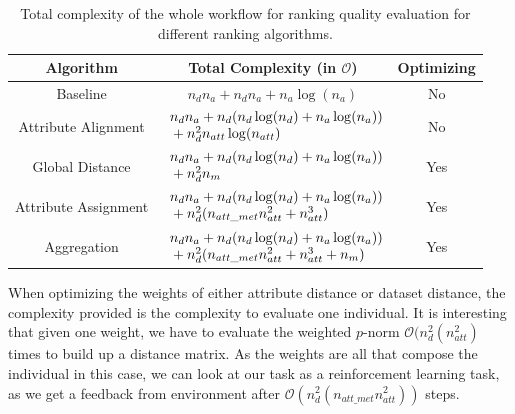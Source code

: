  \begin{table} 
 	\caption{Total complexity of the whole workflow for ranking quality evaluation for different ranking algorithms.}
 	\label{table:totalComplexities}
 	\centering 
 	\renewcommand{\arraystretch}{1.3}
 	\begin{tabular}{|c| c| c|}
 		\hline %
 		Algorithm & Total Complexity (in $\mathcal{O}$) & Optimizing \\
 		\hline 
 		Baseline & $n_dn_a + n_dn_a + n_a\log(n_a)$ & No\\ 
 		\hline 
 		Attribute Alignment& $\begin{array} {r@{}l@{}} & {} n_dn_a + n_d(n_d\log(n_d)+n_a\log(n_a)) \\ & {} + n_d^2n_{att}\log(n_{att}) \end{array}$ & No\\    \hline 
	 	Global Distance& $\begin{array} {r@{}l@{}} & {} n_dn_a + n_d(n_d\log(n_d)+n_a\log(n_a)) \\ & {} + n_d^2n_m \end{array}$ & Yes\\    \hline 
 		Attribute Assignment& $\begin{array} {r@{}l@{}} & {} n_dn_a + n_d(n_d\log(n_d)+n_a\log(n_a)) \\ & {} + n_d^2(n_{att\_met}n_{att}^2+n_{att}^3) \end{array}$ & Yes\\    \hline 
 		Aggregation& $\begin{array} {r@{}l@{}} & {} n_dn_a + n_d(n_d\log(n_d)+n_a\log(n_a)) \\ & {} +  n_d^2(n_{att\_met}n_{att}^2+n_{att}^3+n_m) \end{array}$ & Yes\\    \hline 
 	\end{tabular}
 \end{table}
 
 
 
When optimizing the weights of either attribute distance or dataset distance, the complexity provided is the complexity to evaluate one individual. It is interesting that given one weight, we have to evaluate the weighted $p$-norm $\mathcal{O}(n_d^2(n_{att}^2)$ times to build up a distance matrix. As the weights are all that compose the individual in this case, we can look at our task as a reinforcement learning task, as we get a feedback from environment after $\mathcal{O}(n_d^2(n_{att\_met}n_{att}^2))$ steps.

